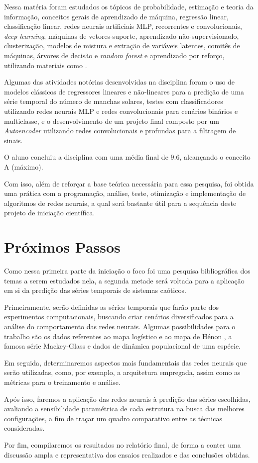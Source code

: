 \documentclass[a4paper, 12pt]{article}
\begin{document}
Nessa matéria foram estudados os tópicos de probabilidade, estimação e teoria da informação, conceitos gerais de aprendizado de máquina, regressão linear, classificação linear, redes neurais artificiais MLP, recorrentes e convolucionais, \textit{deep learning}, máqui\-nas de vetores-suporte, aprendizado não-supervisionado, clusterização, modelos de mistura e extração de variáveis latentes, comitês de máquinas, árvores de decisão e \textit{random forest} e aprendizado por reforço, utilizando materiais como \cite{geron2019hands, haykin2010neural, bishop2006pattern, hastie2009elements}.

Algumas das atividades notórias desenvolvidas na disciplina foram o uso de modelos clássicos de regressores lineares e não-lineares para a predição de uma série temporal do número de manchas solares, testes com classificadores utilizando redes neurais MLP e redes convolucionais para cenários binários e multiclasse, e o desenvolvimento de um projeto final composto por um \textit{Autoencoder} utilizando redes convolucionais e profundas para a filtragem de sinais.

O aluno concluiu a disciplina com uma média final de $9.6$, alcançando o conceito A (máximo). 

Com isso, além de reforçar a base teórica necessária para essa pesquisa, foi obtida uma prática com a programação, análise, teste, otimização e implementação de algoritmos de redes neurais, a qual  será bastante útil para a sequência deste projeto de iniciação científica.

\section{Próximos Passos}

Como nessa primeira parte da iniciação o foco foi uma pesquisa bibliográfica dos temas a serem estudados nela, a segunda metade será voltada para a aplicação em si da predição das séries temporais de sistemas caóticos.

Primeiramente, serão definidas as séries temporais que farão parte dos experimentos computacionais, buscando criar cenários diversificados para a análise do comportamento das redes neurais. Algumas possibilidades para o trabalho são os dados referentes ao mapa logístico \cite{may2004simple} e ao mapa de Hénon \cite{henon1976two}, a famosa série Mackey-Glass \cite{mackey1977oscillation} e dados de dinâmica populacional de uma espécie.

Em seguida, determinaremos aspectos mais fundamentais das redes neurais que serão utilizadas, como, por exemplo, a arquitetura empregada, assim como as métricas para o treinamento e análise.

Após isso, faremos a aplicação das redes neurais à predição das séries escolhidas, avaliando a sensibilidade paramétrica de cada estrutura na busca das melhores configurações, a fim de traçar um quadro comparativo entre as técnicas consideradas. 

Por fim, compilaremos os resultados no relatório final, de forma a conter uma discussão ampla e representativa dos ensaios realizados e das conclusões obtidas. 




\end{document}
